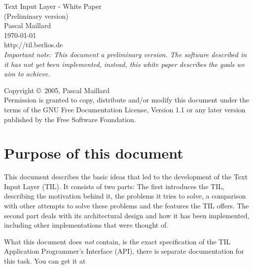 \documentclass[a4paper]{article}
\def\tilurl{http://til.berlios.de}
\begin{document}

\begin{titlepage}
\vspace*{4cm}
\begin{center}
\huge{Text Input Layer - White Paper}\\
\huge{(Preliminary version)}\\
\vspace{1cm}
\large{Pascal Maillard}\\
\vspace{.5cm}
\large{\today}\\
\vspace{1cm}
\large{\tilurl}\\
\vspace{1cm}
\large{\emph{Important note: This document a preliminary version. The software described in it has \emph{not yet been implemented}, instead, this white paper describes the goals we aim to achieve.}}\\
\end{center}
\vfill
Copyright \copyright\ 2005, Pascal Maillard\\
Permission is granted to copy, distribute and/or modify this document under the terms of the GNU Free Documentation License, Version 1.1 or any later version published by the Free Software Foundation.
\end{titlepage}

\begin{titlepage}
\tableofcontents
\listoffigures
\listoftables
\end{titlepage}

\section{Purpose of this document}

This document describes the basic ideas that led to the development of the Text Input Layer (TIL). It consists of two parts: The first introduces the TIL, describing the motivation behind it, the problems it tries to solve, a comparison with other attempts to solve these problems and the features the TIL offers. The second part deals with its architectural design and how it has been implemented, including other implementations that were thought of.

What this document does \emph{not} contain, is the exact specification of the TIL Application Programmer's Interface (API), there is separate documentation for this task. You can get it at
\end{document}
